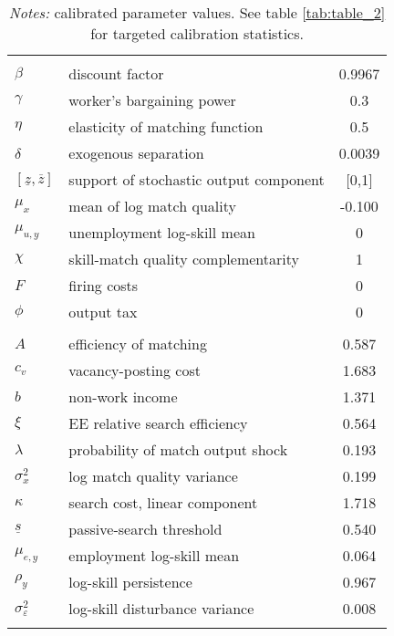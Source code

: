 \begin{table}[!h]
\small
\centering
{}
\label{tab:table_1}
\begin{tabular}{l  l  c}
\hline \hline
\addlinespace
\addlinespace
\multicolumn{ 3 }{l}{\textit{Preset / normalizations}}   \\
\addlinespace
$\beta$   \hspace{30pt}  & discount factor \hspace{175pt} &0.9967\\
$\gamma$                  & worker's bargaining power &0.3\\
$\eta$                    & elasticity of matching function &0.5\\
$\delta$                  & exogenous separation &0.0039\\
$[\underline{z},\overline{z}]$   & support of stochastic output component & [0,1] \\
$\mu_x$                   & mean of log match quality &-0.100\\
$\mu_{u,y}$               & unemployment log-skill mean &0\\
$\chi$                    & skill-match quality complementarity &1\\
$F$                        & firing costs &0\\
$\phi$                    & output tax &0\\
\addlinespace
\addlinespace
\addlinespace
\multicolumn{ 3 }{l}{\textit{Internal}}   \\
\addlinespace
$A$              & efficiency of matching &0.587\\
$c_v$            & vacancy-posting cost &1.683\\
$b$              & non-work income        &1.371\\
$\xi$           & EE relative search efficiency &0.564\\
$\lambda$       & probability of match output shock &0.193\\
$\sigma_x^2$    & log match quality variance &0.199\\
$\kappa$        & search cost, linear component &1.718\\
$\underline{s}$ & passive-search threshold &0.540\\
$\mu_{e,y}$     & employment log-skill mean &0.064\\
$\rho_y$        & log-skill persistence &0.967\\
$\sigma_{\varepsilon}^2$  & log-skill disturbance variance &0.008\\
\addlinespace
\addlinespace
\hline \hline
\end{tabular}
\caption*{\footnotesize{\textit{Notes:} calibrated parameter values. See table \ref{tab:table_2} for targeted calibration statistics.
  }}
\end{table}